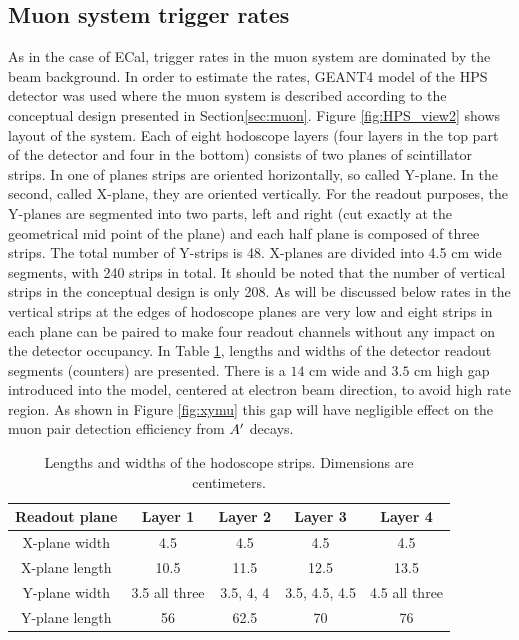 \subsection{Muon system trigger rates}
\label{sec:muontrigg}

As in the case of ECal, trigger rates in the muon system are dominated by the beam background. In order to estimate the rates, GEANT4 model of the HPS detector was used where the muon system is described according to the conceptual design presented in Section\ref{sec:muon}. Figure \ref{fig:HPS_view2} shows layout of the system. Each of eight hodoscope layers (four layers in the top part of the detector and four in the bottom) consists of two planes of scintillator strips. In one of planes strips are oriented horizontally, so called Y-plane. In the second, called X-plane, they are oriented vertically. For the readout purposes, the Y-planes are segmented into two parts, left and right (cut exactly at the geometrical mid point of the plane) and each half plane is composed of three strips. The total number of Y-strips is 48. X-planes are divided into 4.5 cm wide segments, with 240 strips in total. It should be noted that the number of vertical strips in the conceptual design is only 208. As will be discussed below rates in the vertical strips at the edges of hodoscope planes are very low and eight strips in each plane can be paired to make four readout channels without any impact on the detector occupancy. In Table \ref{tb:muonstrp}, lengths and widths of the detector readout segments (counters) are presented. There is a $14$ cm wide and $3.5$ cm high gap introduced into the model, centered at electron beam direction, to avoid high rate region. As shown in Figure \ref{fig:xymu} this gap will have negligible effect on the muon pair detection efficiency from $A^\prime$ decays. 

\begin{table}[htdp]
\caption{Lengths and widths of the hodoscope strips. Dimensions are centimeters.}
\begin{center}
\begin{tabular}{|c|c|c|c|c|}
\hline\hline
Readout plane& Layer 1&Layer 2&Layer 3& Layer 4 \\
\hline
X-plane width& 4.5& 4.5 & 4.5 & 4.5  \\
X-plane length&10.5&11.5&12.5&13.5\\
\hline
Y-plane width& 3.5 all three&3.5, 4, 4  & 3.5, 4.5, 4.5 & 4.5 all three\\
Y-plane length&56&62.5&70&76\\
\hline\hline
\end{tabular}
\end{center}
\label{tb:muonstrp}
\end{table}%

